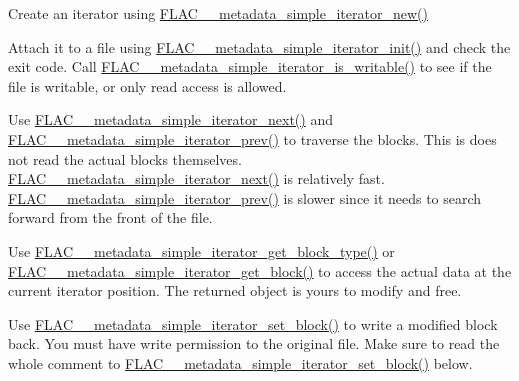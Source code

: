 \begin{DoxyItemize}
\item Create an iterator using \mbox{\hyperlink{group__flac__metadata__level1_ga5b32f4eba211e05727428e9080f4e393}{F\+L\+A\+C\+\_\+\+\_\+metadata\+\_\+simple\+\_\+iterator\+\_\+new()}}
\item Attach it to a file using \mbox{\hyperlink{group__flac__metadata__level1_ga2a055cca4e6e06ae62517c8b0fa6e8a3}{F\+L\+A\+C\+\_\+\+\_\+metadata\+\_\+simple\+\_\+iterator\+\_\+init()}} and check the exit code. Call \mbox{\hyperlink{group__flac__metadata__level1_gadc654c1361b53737bab20efa3e75a0fc}{F\+L\+A\+C\+\_\+\+\_\+metadata\+\_\+simple\+\_\+iterator\+\_\+is\+\_\+writable()}} to see if the file is writable, or only read access is allowed.
\item Use \mbox{\hyperlink{group__flac__metadata__level1_gacac860d14fc0ff37cc2c034d3f972320}{F\+L\+A\+C\+\_\+\+\_\+metadata\+\_\+simple\+\_\+iterator\+\_\+next()}} and \mbox{\hyperlink{group__flac__metadata__level1_ga49f495dec0f44116d66e1b79356a1160}{F\+L\+A\+C\+\_\+\+\_\+metadata\+\_\+simple\+\_\+iterator\+\_\+prev()}} to traverse the blocks. This is does not read the actual blocks themselves. \mbox{\hyperlink{group__flac__metadata__level1_gacac860d14fc0ff37cc2c034d3f972320}{F\+L\+A\+C\+\_\+\+\_\+metadata\+\_\+simple\+\_\+iterator\+\_\+next()}} is relatively fast. \mbox{\hyperlink{group__flac__metadata__level1_ga49f495dec0f44116d66e1b79356a1160}{F\+L\+A\+C\+\_\+\+\_\+metadata\+\_\+simple\+\_\+iterator\+\_\+prev()}} is slower since it needs to search forward from the front of the file.
\item Use \mbox{\hyperlink{group__flac__metadata__level1_ga4649a49d230ac8bfc3ec88f5196205bb}{F\+L\+A\+C\+\_\+\+\_\+metadata\+\_\+simple\+\_\+iterator\+\_\+get\+\_\+block\+\_\+type()}} or \mbox{\hyperlink{group__flac__metadata__level1_ga31c9e013b3bdc04866eee2271349fe60}{F\+L\+A\+C\+\_\+\+\_\+metadata\+\_\+simple\+\_\+iterator\+\_\+get\+\_\+block()}} to access the actual data at the current iterator position. The returned object is yours to modify and free.
\item Use \mbox{\hyperlink{group__flac__metadata__level1_ga7d1ceb2db292c968ae6ac18ecb15c356}{F\+L\+A\+C\+\_\+\+\_\+metadata\+\_\+simple\+\_\+iterator\+\_\+set\+\_\+block()}} to write a modified block back. You must have write permission to the original file. Make sure to read the whole comment to \mbox{\hyperlink{group__flac__metadata__level1_ga7d1ceb2db292c968ae6ac18ecb15c356}{F\+L\+A\+C\+\_\+\+\_\+metadata\+\_\+simple\+\_\+iterator\+\_\+set\+\_\+block()}} below.

\end{DoxyItemize}
